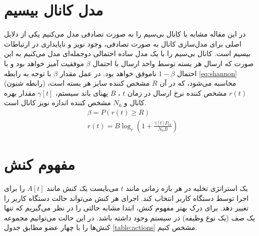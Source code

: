 \section{مدل کانال بیسیم}
\label{sec:wireless}
در این مقاله مشابه با \cite{Liu} کانال بی‌سیم را به صورت تصادفی مدل می‌کنیم یکی از دلایل اصلی برای مدل‌سازی کانال به صورت تصادفی، وجود نویز و ناپایداری در ارتباطات بیسیم است. کانال بی‌سیم را با یک مدل ساده احتمالی دوجمله‌ای  مدل می‌کنیم به این صورت که ارسال هر بسته توسط واحد ارسال با احتمال \(\beta\) موفقیت آمیز خواهد بود و با احتمال \(1 - \beta\) ناموفق خواهد بود. در عمل مقدار \(\beta\) با توجه به رابطه \ref{eq:shannon} (رابطه شنون) محاسبه می‌شود، که در آن \(R\) مشخص کننده سایز هر بسته است،
$r(t)$
مشخص کننده نرخ ارسال در زمان
$t$
،
 \(B\) پهنای باند سیستم، \(\gamma[t]\) مقدار بهره کانال و \(N_0\) مشخص کننده اندازه نویز کانال است.
\begin{equation}
	\label{eq:shannon}
	\begin{aligned}
		&\beta=P(r(t) \geq R) \\
		&r(t)=B \log _{r}\left(1+\frac{\gamma[t] P_{\mathrm{tx}}}{N_0 B}\right)
	\end{aligned}
\end{equation}
\section{مفهوم کنش}
\label{sec:action}
یک استراتژی تخلیه در هر بازه زمانی مانند \(t\) می‌بایست یک کنش مانند \(A[t]\) را برای اجرا توسط دستگاه کاربر انتخاب کند. اجرای هر کنش می‌تواند حالت دستگاه کاربر را تغییر دهد. برای درک بهتر مفهوم کنش، ابتدا مشابه \cite{Liu} حالتی را در نظر می‌گیریم که تنها یک صف (یک نوع وظیفه) در سیستم وجود داشته باشد. در این حالت می‌توانیم مجموعه کنش‌ها را با چهار عضو مطابق جدول \ref{table:actions} مشخص کنیم.

